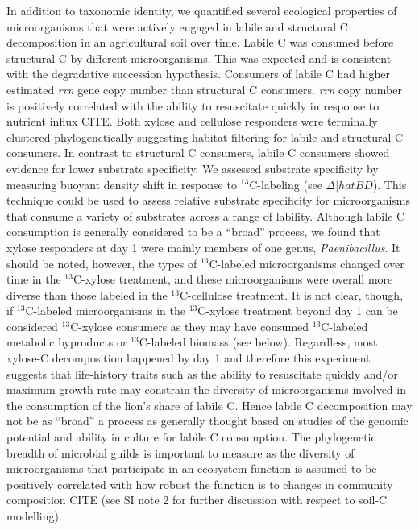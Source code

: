 In addition to taxonomic identity, we quantified several ecological
properties of microorganisms that were actively engaged in labile and
structural C decomposition in an agricultural soil over time. Labile C was consumed
before structural C by different microorganisms. This was expected and is
consistent with the degradative succession hypothesis. Consumers of labile C
had higher estimated \textit{rrn} gene copy number than structural C consumers.
\textit{rrn} copy number is positively correlated with the ability to
resuscitate quickly in response to nutrient influx CITE. Both xylose and cellulose
responders were terminally clustered phylogenetically suggesting habitat filtering
for labile and structural C consumers. In contrast to
structural C consumers, labile C consumers showed evidence for lower substrate
specificity. We assessed substrate specificity by measuring buoyant density
shift in response to $^{13}$C-labeling (see $\Delta|hat{BD}$). This technique
could be used to  assess relative substrate specificity for microorganisms that
consume a variety of substrates across a range of lability.  Although labile C
consumption is generally considered to be a ``broad'' process, we found that
xylose responders at day 1 were mainly members of one genus,
\textit{Paenibacillus}.  It should be noted, however, the types of
$^{13}$C-labeled microorganisms changed over time in the $^{13}$C-xylose
treatment, and these microorganisms were overall more diverse than those
labeled in the $^{13}$C-cellulose treatment. It is not clear, though,  if
$^{13}$C-labeled microorganisms in the $^{13}$C-xylose treatment beyond day 1
can be considered $^{13}$C-xylose consumers as they may have consumed
$^{13}$C-labeled metabolic byproducts or $^{13}$C-labeled biomass (see below).
Regardless, most xylose-C decomposition happened by day 1 and therefore this
experiment suggests that life-history traits such as the ability to resuscitate
quickly and/or maximum growth rate may constrain the diversity of
microorganisms involved in the consumption of the lion's share of labile C. 
Hence labile C decomposition may not be as ``broad'' a process as generally
thought based on studies of the genomic potential and ability in culture for
labile C consumption. The phylogenetic breadth of microbial guilds is important
to measure as the diversity of microorganisms that participate in an ecosystem
function is assumed to be positively correlated with how robust the function is
to changes in community composition CITE (see SI note 2 for further discussion
with respect to soil-C modelling).


